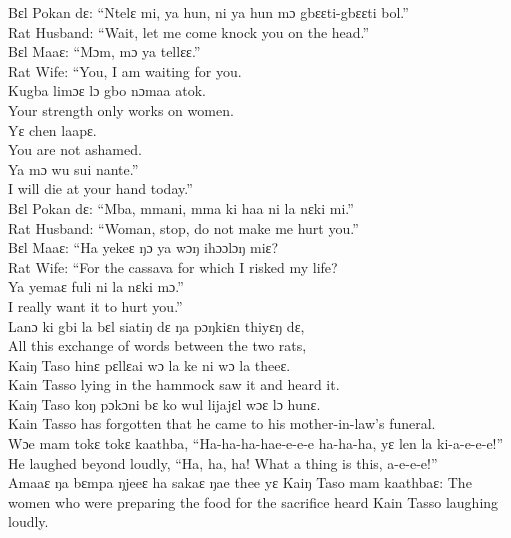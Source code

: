 Bɛl Pokan dɛ: “Ntelɛ mi, ya hun, ni ya hun mɔ gbɛɛti-gbɛɛti bol.”\\
Rat Husband: “Wait, let me come knock you on the head.”\\

Bɛl Maaɛ: “Mɔm, mɔ ya tellɛɛ.”\\
Rat Wife: “You, I am waiting for you.\\

Kugba limɔɛ lɔ gbo nɔmaa atok.\\
Your strength only works on women.\\

Yɛ chen laapɛ.\\
You are not ashamed.\\

Ya mɔ wu sui nante.”\\
I will die at your hand today.”\\

Bɛl Pokan dɛ: “Mba, mmani, mma ki haa ni la nɛki mi.”\\
Rat Husband: “Woman, stop, do not make me hurt you.”\\

Bɛl Maaɛ: “Ha yekeɛ ŋɔ ya wɔŋ ihɔɔlɔŋ miɛ?\\
Rat Wife: “For the cassava for which I risked my life?\\

Ya yemaɛ fuli ni la nɛki mɔ.”\\
I really want it to hurt you.”\\

Lanɔ ki gbi la bɛl siatiŋ dɛ ŋa pɔŋkiɛn thiyɛŋ dɛ,\\
All this exchange of words between the two rats,\\

Kaiŋ Taso hinɛ pɛllɛai wɔ la ke ni wɔ la theeɛ.\\
Kain Tasso lying in the hammock saw it and heard it.\\

Kaiŋ Taso koŋ pɔkɔni bɛ ko wul lijajɛl wɔɛ lɔ hunɛ.\\
Kain Tasso has forgotten that he came to his mother-in-law’s funeral.\\

Wɔe mam tokɛ tokɛ kaathba, “Ha-ha-ha-hae-e-e-e ha-ha-ha, yɛ len la ki-a-e-e-e!”\\
He laughed beyond loudly, “Ha, ha, ha! What a thing is this, a-e-e-e!”\\

Amaaɛ ŋa bɛmpa ŋjeeɛ ha sakaɛ ŋae thee yɛ Kaiŋ Taso mam kaathbaɛ:
The women who were preparing the food for the sacrifice heard Kain Tasso laughing loudly.\\

